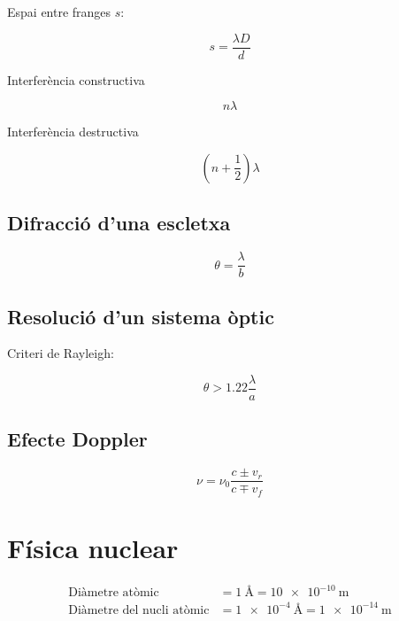 Espai entre franges $s$:

\begin{equation}
    s = \frac{\lambda D}{d}
\end{equation}

Interferència constructiva

\begin{equation}
    n \lambda
\end{equation}

Interferència destructiva

\begin{equation}
    \left( n + \frac{1}{2} \right)\lambda
\end{equation}

\subsection{Difracció d'una escletxa}
\label{sub:difraccio_d_una_escletxa}

\begin{equation}
    \theta = \frac{\lambda}{b}
\end{equation}

\subsection{Resolució d'un sistema òptic}
\label{sub:resolucio_d_un_sistema_optic}

Criteri de Rayleigh:

\begin{equation}
    \theta > 1.22 \frac{\lambda}{a}
\end{equation}

\subsection{Efecte Doppler}
\label{sub:efecte_doppler}

\begin{equation}
    \nu  = \nu_0 \frac{c \pm v_r}{c \mp v_f}
\end{equation}

\section{Física nuclear}
\label{sec:fisica_nuclear}

\begin{align}
    \text{Diàmetre atòmic} &= \SI{1}{\angstrom} = \SI{10e-10}{\metre} \\
    \text{Diàmetre del nucli atòmic} &= \SI{1e-4}{\angstrom} = \SI{1e-14}{\metre}
\end{align}

